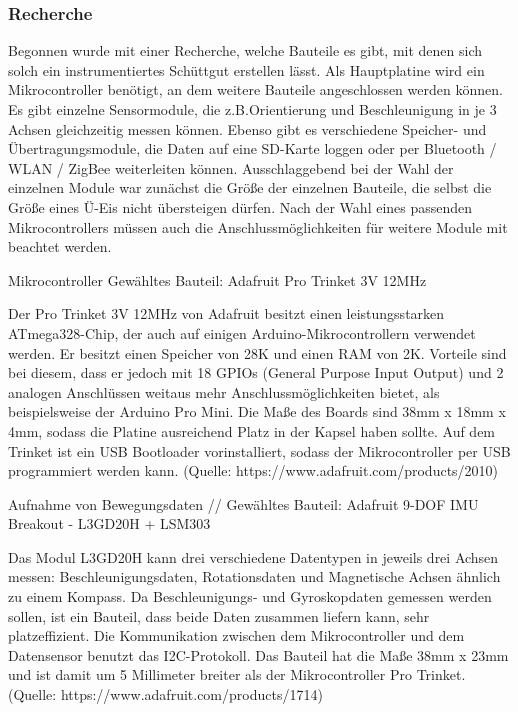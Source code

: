 {\subsubsection*{Recherche}
Begonnen wurde mit einer Recherche, welche Bauteile es gibt, mit denen sich solch ein instrumentiertes Schüttgut erstellen lässt. Als Hauptplatine wird ein Mikrocontroller benötigt, an dem weitere Bauteile angeschlossen werden können. Es gibt einzelne Sensormodule, die z.B.Orientierung und Beschleunigung in je 3 Achsen gleichzeitig messen können. Ebenso gibt es verschiedene Speicher- und Übertragungsmodule, die Daten auf eine SD-Karte loggen oder per Bluetooth / WLAN / ZigBee weiterleiten können. Ausschlaggebend bei der Wahl der einzelnen Module war zunächst die Größe der einzelnen Bauteile, die selbst die Größe eines Ü-Eis nicht übersteigen dürfen. Nach der Wahl eines passenden Mikrocontrollers müssen auch die Anschlussmöglichkeiten für weitere Module mit beachtet werden.

Mikrocontroller
Gewähltes Bauteil: Adafruit Pro Trinket 3V 12MHz

Der Pro Trinket 3V 12MHz von Adafruit besitzt einen leistungsstarken ATmega328-Chip, der auch auf einigen Arduino-Mikrocontrollern verwendet werden. Er besitzt einen Speicher von 28K und einen RAM von 2K. Vorteile sind bei diesem, dass er jedoch mit 18 GPIOs (General Purpose Input Output) und 2 analogen Anschlüssen weitaus mehr Anschlussmöglichkeiten bietet, als beispielsweise der Arduino Pro Mini. Die Maße des Boards sind  38mm x 18mm x 4mm, sodass die Platine ausreichend Platz in der Kapsel haben sollte. Auf dem Trinket ist ein USB Bootloader vorinstalliert, sodass der Mikrocontroller per USB programmiert werden kann. (Quelle: https://www.adafruit.com/products/2010)

Aufnahme von Bewegungsdaten //
Gewähltes Bauteil: Adafruit 9-DOF IMU Breakout - L3GD20H + LSM303

Das Modul L3GD20H kann drei verschiedene Datentypen in jeweils drei Achsen messen: Beschleunigungsdaten, Rotationsdaten und Magnetische Achsen ähnlich zu einem Kompass. Da Beschleunigungs- und Gyroskopdaten gemessen werden sollen, ist ein Bauteil, dass beide Daten zusammen liefern kann, sehr platzeffizient. Die Kommunikation zwischen dem Mikrocontroller und dem Datensensor benutzt das I2C-Protokoll. Das Bauteil hat die Maße 38mm x 23mm und ist damit um 5 Millimeter breiter als der Mikrocontroller Pro Trinket. (Quelle: https://www.adafruit.com/products/1714)

}
